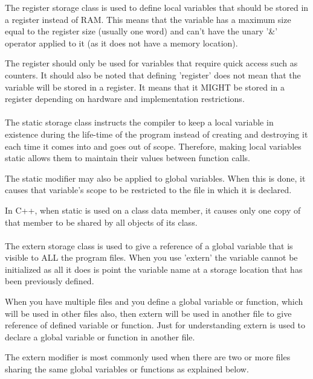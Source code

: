 \documentclass[10pt,a4paper]{scrartcl}
\begin{document}
\begin{multicols*}{2}
The register storage class is used to define local variables that should be stored in a register instead of RAM. This means that the variable has a maximum size equal to the register size (usually one word) and can't have the unary '\&' operator applied to it (as it does not have a memory location).

The register should only be used for variables that require quick access such as counters. It should also be noted that defining 'register' does not mean that the variable will be stored in a register. It means that it MIGHT be stored in a register depending on hardware and implementation restrictions.

\paragraph{}

The static storage class instructs the compiler to keep a local variable in existence during the life-time of the program instead of creating and destroying it each time it comes into and goes out of scope. Therefore, making local variables static allows them to maintain their values between function calls.

The static modifier may also be applied to global variables. When this is done, it causes that variable's scope to be restricted to the file in which it is declared.

In C++, when static is used on a class data member, it causes only one copy of that member to be shared by all objects of its class.

\paragraph{}

The extern storage class is used to give a reference of a global variable that is visible to ALL the program files. When you use 'extern' the variable cannot be initialized as all it does is point the variable name at a storage location that has been previously defined.

When you have multiple files and you define a global variable or function, which will be used in other files also, then extern will be used in another file to give reference of defined variable or function. Just for understanding extern is used to declare a global variable or function in another file.

The extern modifier is most commonly used when there are two or more files sharing the same global variables or functions as explained below.


\end{multicols*}
\end{document}
